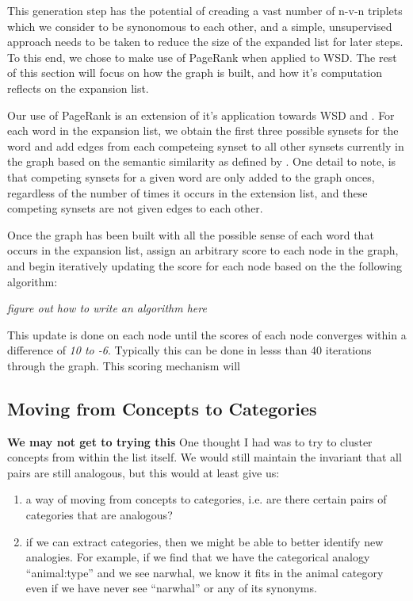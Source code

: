 \documentclass[11pt]{article}
\begin{document}
This generation step has the potential of creading a vast number of n-v-n
triplets which we consider to be synonomous to each other, and a simple,
unsupervised approach needs to be taken to reduce the size of the expanded list
for later steps.  To this end, we chose to make use of PageRank when applied to
WSD.  The rest of this section will focus on how the graph is built, and how
it's computation reflects on the expansion list.

Our use of PageRank is an extension of it's application towards WSD
\cite{mihalcea04pagerankwsd} and \cite{mihalcea06randomwalks}.  For each word in
the expansion list, we obtain the first three possible synsets for the word and
add edges from each competeing synset to all other synsets currently in the
graph based on the semantic similarity as defined by
\cite{banerjee03extendedgloss}.  One detail to note, is that competing synsets
for a given word are only added to the graph onces, regardless of the number of
times it occurs in the extension list, and these competing synsets are not
given edges to each other. 

Once the graph has been built with all the possible sense of each word that
occurs in the expansion list, assign an arbitrary score to each node in the
graph, and begin iteratively updating the score for each node based on the the
following algorithm:

\emph{figure out how to write an algorithm here}

This update is done on each node until the scores of each node converges within
a difference of \emph{10 to -6}.  Typically this can be done in lesss than 40
iterations through the graph.  This scoring mechanism will 
\subsection{Moving from Concepts to Categories}

{\bf We may not get to trying this} One thought I had was to try to cluster
concepts from within the list itself.  We would still maintain the invariant
that all pairs are still analogous, but this would at least give us:
\begin{enumerate}
  \item a way of moving from concepts to categories, i.e. are there certain
    pairs of categories that are analogous?
  \item if we can extract categories, then we might be able to better identify
    new analogies.  For example, if we find that we have the categorical analogy
    ``animal:type'' and we see narwhal, we know it fits in the animal category
    even if we have never see ``narwhal'' or any of its synonyms.
\end{enumerate}
\end{document}
